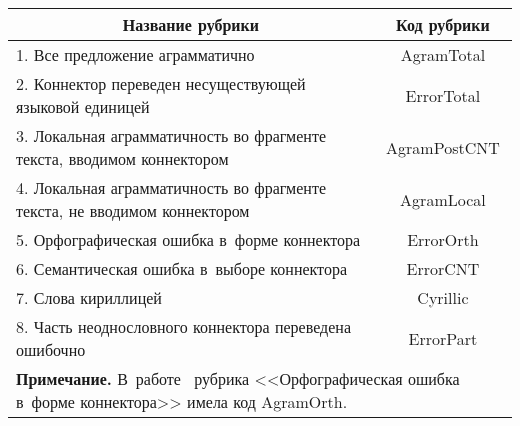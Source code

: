 \begin{table*}[h]\small %
\vspace*{-12pt}
\begin{center}
\vspace*{2ex}

\begin{tabular}{|l|c|}
\hline
\multicolumn{1}{|c|}{Название рубрики}&Код рубрики\\
\hline
1. Все предложение аграмматично&AgramTotal\\
2. Коннектор переведен несуществующей языковой единицей&ErrorTotal\\
3. Локальная аграмматичность во фрагменте текста, вводимом 
коннектором&AgramPostCNT\\
4. Локальная аграмматичность во фрагменте текста, не вводимом 
коннектором&AgramLocal\\
5. Орфографическая ошибка в~форме коннектора&ErrorOrth\\
6. Семантическая ошибка в~выборе коннектора&ErrorCNT\\
7. Слова кириллицей&Cyrillic\\
8. Часть неоднословного коннектора переведена ошибочно&ErrorPart\\
\hline
   \multicolumn{2}{l}{\footnotesize \hspace*{2mm}\textbf{Примечание.} В~работе~\cite{16-gz} рубрика 
<<Орфографическая ошибка в~форме коннектора>> имела код AgramOrth.}
   \end{tabular}
   \end{center}
   \vspace*{-12pt}
   \end{table*}
   
